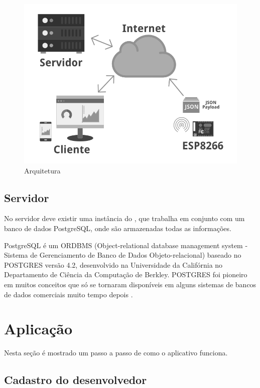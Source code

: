 \begin{figure}[h]
    \centering
    \includegraphics[scale=0.5]{img/arquitetura-grey.png}
    \caption{Arquitetura} \label{fig:arquitetura}
\end{figure}

\subsection{Servidor}\label{servidor}

No servidor deve existir uma instância do \wm, que trabalha em conjunto
com um banco de dados PostgreSQL, onde são armazenadas todas as
informações.

PostgreSQL é um ORDBMS (Object-relational database management system -
Sistema de Gerenciamento de Banco de Dados Objeto-relacional) baseado no
POSTGRES versão 4.2, desenvolvido na Universidade da Califórnia no
Departamento de Ciência da Computação de Berkley. POSTGRES foi pioneiro
em muitos conceitos que só se tornaram disponíveis em alguns sistemas de
bancos de dados comerciais muito tempo depois \cite{postgresql:2016}.

\section{Aplicação}\label{aplicauxe7uxe3o}

Nesta seção é mostrado um passo a passo de como o aplicativo funciona.

\subsection{Cadastro do desenvolvedor}\label{cadastro-do-desenvolvedor}

